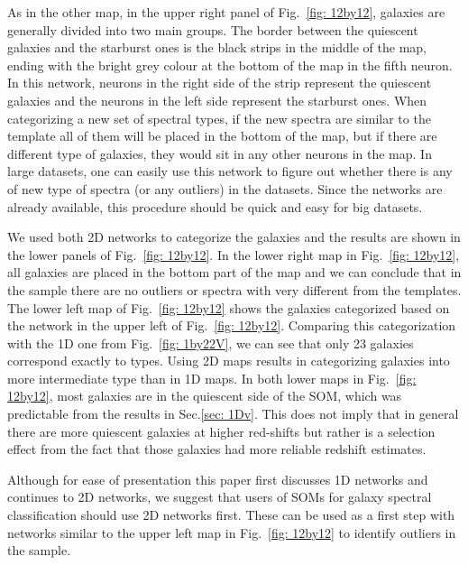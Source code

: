     As in the other map, in the upper right panel of Fig.~\ref{fig: 12by12}, galaxies are generally divided into two main groups.
    The border between the quiescent galaxies and the starburst ones is the black strips in the middle of the map,  ending with the bright grey colour at the bottom of the map in the fifth neuron.
    In this network, neurons in the right side of the strip represent the quiescent galaxies and the neurons in the left side represent the starburst ones. 
    When categorizing a new set of spectral types, if the new spectra are similar to the  template all of them will be placed in the bottom of the map, but if there are different type of galaxies, they would sit in any other neurons in the map.
    In large datasets, one can easily use this network to figure out whether there is any of new type of spectra (or any outliers) in the datasets. 
    Since the networks are already available, this procedure should be quick and easy for big datasets.
    
    We used both 2D networks to categorize the  galaxies and the results are shown in the lower panels of Fig.~\ref{fig: 12by12}.
    In the lower right map in Fig.~\ref{fig: 12by12}, all galaxies are placed in the bottom part of the map and we can conclude that in the  sample there are no outliers or spectra with very different from the  templates.
    The lower left map of Fig.~\ref{fig: 12by12} shows the  galaxies categorized based on the network in the upper left of Fig.~\ref{fig: 12by12}. 
    Comparing this categorization with the 1D one from Fig.~\ref{fig: 1by22V}, we can see that only 23 galaxies correspond exactly to  types.
    Using 2D maps results in categorizing galaxies into more intermediate type than in 1D maps.
    In both lower maps in Fig.~\ref{fig: 12by12}, most galaxies are in the quiescent side of the SOM, which was predictable from the results in Sec.\ref{sec: 1Dv}. This does not imply that in general there are more quiescent galaxies at higher red-shifts but rather is a selection effect from the fact that those galaxies had more reliable redshift estimates.
    
    Although for ease of presentation this paper first discusses 1D networks and continues to 2D networks, we suggest that users of SOMs for galaxy spectral classification should use 2D networks first. These can be used as a first step with networks similar to the upper left map in Fig.~\ref{fig: 12by12} to identify outliers in the sample.


